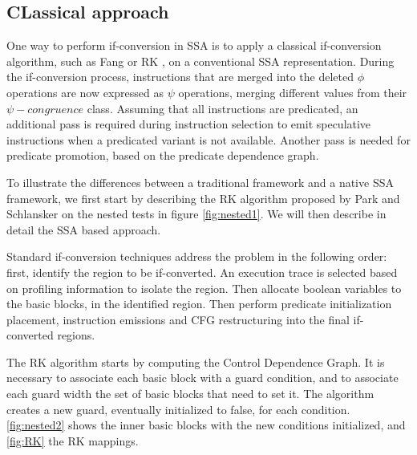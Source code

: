 \subsection{CLassical approach}

One way to perform if-conversion in SSA is to apply a classical if-conversion algorithm, such as Fang \cite{Fang:1996:CAI:645674.663446} or RK \cite{Schlansker-predicated}, on a conventional SSA representation. 
During the if-conversion process, instructions that are merged into the deleted $\phi$ operations are now expressed as $\psi$ operations, merging different values from their $\psi-congruence$ class. Assuming that all instructions are predicated, an additional pass is required during instruction selection to emit speculative instructions when a predicated variant is not available. Another pass is needed for predicate promotion, based on the predicate dependence graph.

To illustrate the differences between a traditional framework and a native SSA framework, we first start by describing the RK algorithm proposed by Park and Schlansker on the nested tests in figure \ref{fig:nested1}. We will then describe in detail the SSA based approach.

Standard if-conversion techniques address the problem in the following order: first, identify the region to be if-converted. An execution trace is selected based on profiling information to isolate the region. Then allocate boolean variables to the basic blocks, in the identified region. Then perform predicate initialization placement, instruction emissions and CFG restructuring into the final if-converted regions.

The RK algorithm starts by computing the Control Dependence Graph. It is necessary to associate each basic block with a guard condition, and to associate each guard width the set of basic blocks that need to set it. The algorithm creates a new guard, eventually initialized to false, for each condition. \ref{fig:nested2} shows the inner basic blocks with the new conditions initialized, and \ref{fig:RK} the RK mappings.

